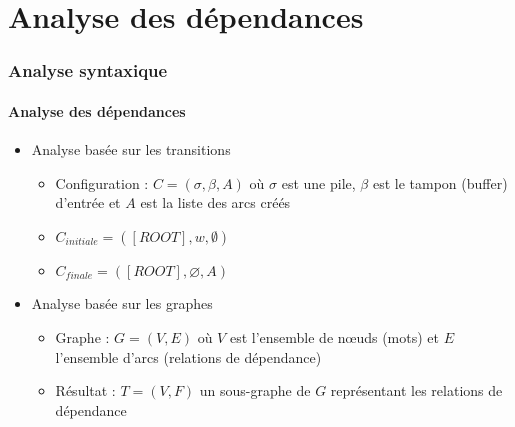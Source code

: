 \documentclass[xcolor=table]{beamer}
\begin{document}
\section{Analyse des dépendances}

\begin{frame}
\frametitle{Analyse syntaxique}
\framesubtitle{Analyse des dépendances}

\begin{minipage}{.6\textwidth}
\begin{itemize}
	\item Analyse basée sur les transitions 
	\begin{itemize}
		\item Configuration :  $C = (\sigma, \beta, A)$ où $\sigma$ est une pile, $\beta$ est le tampon (buffer) d'entrée et $A$ est la liste des arcs créés
		\item $C_{initiale} = ([ROOT], w, \emptyset)$
		\item $C_{finale} = ([ROOT], \varnothing, A)$
	\end{itemize}
\end{itemize}
\end{minipage}
\begin{minipage}{.38\textwidth}
\end{minipage}

%
\vfill

\begin{minipage}{.6\textwidth}
	\begin{itemize}
		\item Analyse basée sur les graphes
		\begin{itemize}
			\item Graphe : $G = (V, E)$ où $V$ est l'ensemble de nœuds (mots) et $E$ l'ensemble d'arcs (relations de dépendance)
			\item Résultat : $T = (V, F)$ un sous-graphe de $G$ représentant les relations de dépendance
		\end{itemize}
	\end{itemize}
\end{minipage}
\begin{minipage}{.38\textwidth}
\end{minipage}

\end{frame}
\end{document}
